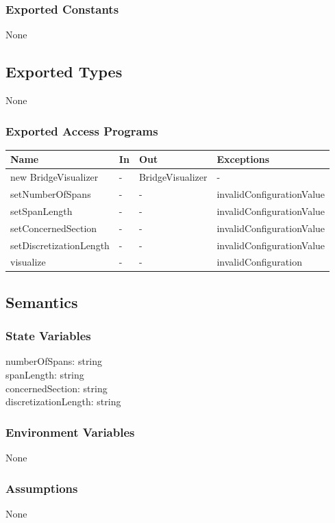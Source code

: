 \documentclass[12pt, titlepage]{article}
\begin{document}
\subsubsection{Exported Constants}
None
\subsection{Exported Types}
None

\subsubsection{Exported Access Programs}
\begin{center}
\begin{tabular}{p{5cm} p{2cm} p{4cm} p{5.5cm}}
\hline
\textbf{Name} & \textbf{In} & \textbf{Out} & \textbf{Exceptions} \\
\hline
new BridgeVisualizer & - & BridgeVisualizer & - \\
\hline
setNumberOfSpans & - & - & invalidConfigurationValue \\
\hline
setSpanLength & - & - & invalidConfigurationValue\\
\hline
setConcernedSection & - & - & invalidConfigurationValue \\
\hline
setDiscretizationLength & - & - & invalidConfigurationValue \\
\hline
visualize & - & - & invalidConfiguration \\
\hline
\end{tabular}
\end{center}

\subsection{Semantics}

\subsubsection{State Variables}
numberOfSpans: string\\
spanLength: string\\
concernedSection: string\\
discretizationLength: string
\subsubsection{Environment Variables}
None
\subsubsection{Assumptions}
None
\end{document}
